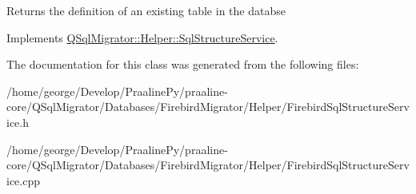 \begin{DoxyReturn}{Returns}
the definition of an existing table in the databse 
\end{DoxyReturn}


Implements \hyperlink{class_q_sql_migrator_1_1_helper_1_1_sql_structure_service_abb2f11402700c1a1e52d596431255e8a}{Q\+Sql\+Migrator\+::\+Helper\+::\+Sql\+Structure\+Service}.



The documentation for this class was generated from the following files\+:\begin{DoxyCompactItemize}
\item 
/home/george/\+Develop/\+Praaline\+Py/praaline-\/core/\+Q\+Sql\+Migrator/\+Databases/\+Firebird\+Migrator/\+Helper/Firebird\+Sql\+Structure\+Service.\+h\item 
/home/george/\+Develop/\+Praaline\+Py/praaline-\/core/\+Q\+Sql\+Migrator/\+Databases/\+Firebird\+Migrator/\+Helper/Firebird\+Sql\+Structure\+Service.\+cpp\end{DoxyCompactItemize}
